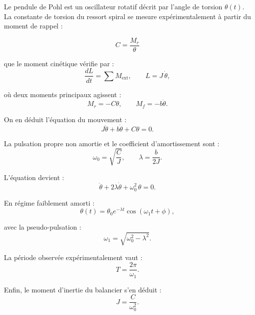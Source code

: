 Le pendule de Pohl est un oscillateur rotatif décrit par l’angle de torsion $\theta(t)$.  
La constante de torsion du ressort spiral se mesure expérimentalement à partir du moment de rappel :

\begin{equation}
C = \frac{M_r}{\theta}
\label{eq:C}
\end{equation}

que le moment cinétique vérifie par :
\begin{equation}
\frac{dL}{dt} = \sum M_{\mathrm{ext}},
\qquad
L = J\,\dot{\theta},
\label{eq:TMC}
\end{equation}

où deux moments principaux agissent :
\begin{equation}
M_r = -C\theta, \qquad M_f = -b\dot{\theta}.
\label{eq:MOMENTS}
\end{equation}

On en déduit l’équation du mouvement :
\begin{equation}
J\ddot{\theta} + b\dot{\theta} + C\theta = 0.
\label{eq:edo}
\end{equation}

La pulsation propre non amortie et le coefficient d’amortissement sont :
\begin{equation}
\omega_0 = \sqrt{\frac{C}{J}}, \qquad \lambda = \frac{b}{2J}.
\label{eq:lambda}
\end{equation}

L’équation devient :
\begin{equation}
\ddot{\theta} + 2\lambda\dot{\theta} + \omega_0^2\,\theta = 0.
\label{eq:cara}
\end{equation}

En régime faiblement amorti :
\begin{equation}
\theta(t)=\theta_0 e^{-\lambda t}\cos(\omega_1 t+\phi),
\label{eq:solution}
\end{equation}

avec la pseudo-pulsation :
\begin{equation}
\omega_1=\sqrt{\omega_0^2 - \lambda^2}.
\label{eq:w}
\end{equation}

La période observée expérimentalement vaut :
\begin{equation}
T = \frac{2\pi}{\omega_1}.
\label{eq:t}
\end{equation}

Enfin, le moment d’inertie du balancier s’en déduit :
\begin{equation}
J = \frac{C}{\omega_0^2}.
\label{eq:J}
\end{equation}



